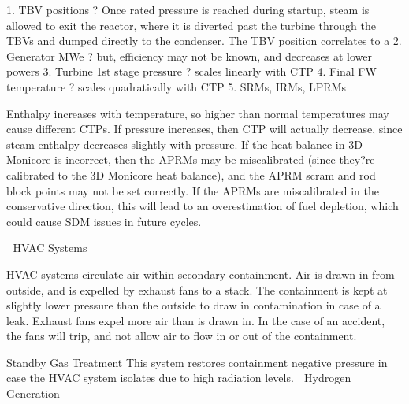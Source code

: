 \documentclass[10pt]{article}
\begin{document}
1.	TBV positions ? Once rated pressure is reached during startup, steam is allowed to exit the reactor, where it is diverted past the turbine through the TBVs and dumped directly to the condenser. The TBV position correlates to a %
2.	Generator MWe ? but, efficiency may not be known, and decreases at lower powers
3.	Turbine 1st stage pressure ? scales linearly with CTP
4.	Final FW temperature ? scales quadratically with CTP
5.	SRMs, IRMs, LPRMs

Enthalpy increases with temperature, so higher than normal temperatures may cause different CTPs. If pressure increases, then CTP will actually decrease, since steam enthalpy decreases slightly with pressure. If the heat balance in 3D Monicore is incorrect, then the APRMs may be miscalibrated (since they?re calibrated to the 3D Monicore heat balance), and the APRM scram and rod block points may not be set correctly. If the APRMs are miscalibrated in the conservative direction, this will lead to an overestimation of fuel depletion, which could cause SDM issues in future cycles. 



HVAC Systems

HVAC systems circulate air within secondary containment. Air is drawn in from outside, and is expelled by exhaust fans to a stack. The containment is kept at slightly lower pressure than the outside to draw in contamination in case of a leak. Exhaust fans expel more air than is drawn in. In the case of an accident, the fans will trip, and not allow air to flow in or out of the containment. 

Standby Gas Treatment
This system restores containment negative pressure in case the HVAC system isolates due to high radiation levels. 
Hydrogen Generation
\end{document}

